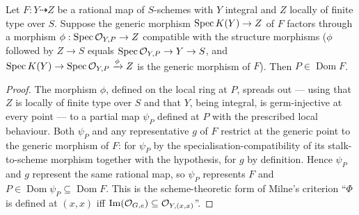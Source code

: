 \begin{theorem}
  \label{pa-thm:spreading_criterion_stalk}
  \leanok

  Let \(F : Y \dashrightarrow Z\) be a rational map of \(S\)-schemes with \(Y\)
  integral and \(Z\) locally of finite type over \(S\). Suppose the generic
  morphism \(\operatorname{Spec} K(Y) \to Z\) of \(F\) factors through a morphism
  \(\phi : \operatorname{Spec} \mathcal{O}_{Y,P} \to Z\) compatible with the structure morphisms
  (\(\phi\) followed by \(Z \to S\) equals \(\operatorname{Spec} \mathcal{O}_{Y,P} \to Y \to S\),
  and \(\operatorname{Spec} K(Y) \to \operatorname{Spec} \mathcal{O}_{Y,P} \xrightarrow{\phi} Z\) is the generic
  morphism of \(F\)). Then \(P \in \operatorname{Dom} F\).
\end{theorem}
\begin{proof}
  \leanok
  The morphism \(\phi\), defined on the local ring at \(P\), spreads out --- using
  that \(Z\) is locally of finite type over \(S\) and that \(Y\), being integral,
  is germ-injective at every point --- to a partial map \(\psi_P\) defined at
  \(P\) with the prescribed local behaviour. Both \(\psi_P\) and any
  representative \(g\) of \(F\) restrict at the generic point to the generic
  morphism of \(F\): for \(\psi_P\) by the specialisation-compatibility of its
  stalk-to-scheme morphism together with the hypothesis, for \(g\) by definition.
  Hence \(\psi_P\) and \(g\) represent the same rational map, so \(\psi_P\)
  represents \(F\) and \(P \in \operatorname{Dom}\psi_P \subseteq
  \operatorname{Dom} F\). This is the scheme-theoretic form of Milne's criterion
  ``\(\Phi\) is defined at \((x, x)\) iff \(\operatorname{Im}(\mathcal{O}_{G,e})
  \subseteq \mathcal{O}_{Y,(x,x)}\)''.
\end{proof}


